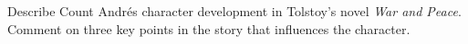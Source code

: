 \needspace{2cm}
\question[5] Describe Count Andrés character development in Tolstoy's novel \textit{War and Peace}.
Comment on three key points in the story that influences the character.
\vspace{6cm}
